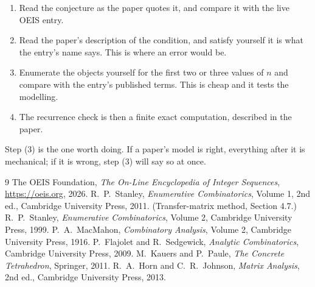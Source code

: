 \documentclass[11pt,a4paper]{article}
\theoremstyle{plain}
\theoremstyle{definition}
\begin{document}
\begin{enumerate}
\item Read the conjecture as the paper quotes it, and compare it with the live OEIS entry.
\item Read the paper's description of the condition, and satisfy yourself it is what the
entry's name says. This is where an error would be.
\item Enumerate the objects yourself for the first two or three values of $n$ and compare with
the entry's published terms. This is cheap and it tests the modelling.
\item The recurrence check is then a finite exact computation, described in the paper.
\end{enumerate}

Step (3) is the one worth doing. If a paper's model is right, everything after it is
mechanical; if it is wrong, step (3) will say so at once.

\begin{thebibliography}{9}
 The OEIS Foundation, \emph{The On-Line Encyclopedia of Integer Sequences},
\url{https://oeis.org}, 2026.
 R.~P.~Stanley, \emph{Enumerative Combinatorics}, Volume 1, 2nd ed.,
Cambridge University Press, 2011. (Transfer-matrix method, Section 4.7.)
 R.~P.~Stanley, \emph{Enumerative Combinatorics}, Volume 2, Cambridge
University Press, 1999.
 P.~A.~MacMahon, \emph{Combinatory Analysis}, Volume 2, Cambridge
University Press, 1916.
 P.~Flajolet and R.~Sedgewick, \emph{Analytic Combinatorics}, Cambridge
University Press, 2009.
 M.~Kauers and P.~Paule, \emph{The Concrete Tetrahedron}, Springer, 2011.
 R.~A.~Horn and C.~R.~Johnson, \emph{Matrix Analysis}, 2nd ed., Cambridge
University Press, 2013.
\end{thebibliography}
\end{document}
